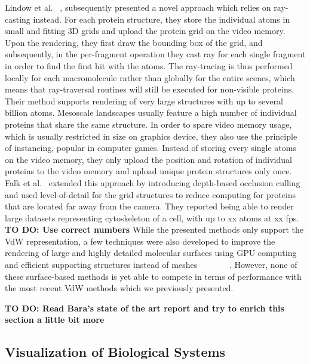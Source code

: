 Lindow et al. ~\cite{lindow2012interactive}, subsequently presented a novel approach which relies on ray-casting instead.
For each protein structure, they store the individual atoms in small and fitting 3D grids and upload the protein grid on the video memory.
Upon the rendering, they first draw the bounding box of the grid, and subsequently, in the per-fragment operation they cast ray for each single fragment in order to find the first hit with the atoms.
The ray-tracing is thus performed locally for each macromolecule rather than globally for the entire scenes, which means that ray-traversal routines will still be executed for non-visible proteins.
Their method supports rendering of very large structures with up to several billion atoms.
Mesoscale landscapes usually feature a high number of individual proteins that share the same structure.
In order to spare video memory usage, which is usually restricted in size on graphics device, they also use the principle of instancing, popular in computer games.
Instead of storing every single atoms on the video memory, they only upload the position and rotation of individual proteins to the video memory and upload unique protein structures only once.
Falk et al.~\cite{falk2013atomistic} extended this approach by introducing depth-based occlusion culling and used level-of-detail for the grid structures to reduce computing for proteins that are located far away from the camera.
They reported being able to render large datasets representing cytoskeleton of a cell, with up to xx atoms at xx fps.
\textbf{TO DO: Use correct numbers}
While the presented methods only support the VdW representation, a few techniques were also developed to improve the rendering of large and highly detailed molecular surfaces using GPU computing and efficient supporting structures instead of meshes ~\cite{krone2012fast}~\cite{parulek2012implicit} ~\cite{parulek2013fast} ~\cite{krone2011parallel} ~\cite{szecsi2012real}. 
However, none of these surface-based methods is yet able to compete in terms of performance with the most recent VdW methods which we previously presented.

\textbf{TO DO: Read Bara's state of the art report and try to enrich this section a little bit more}

\subsection{Visualization of Biological Systems}

